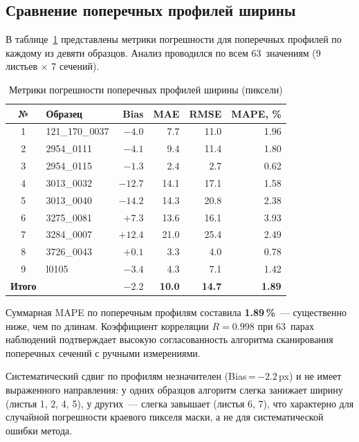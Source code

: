 \subsection{Сравнение поперечных профилей ширины}

В таблице~\ref{tab:cross} представлены метрики погрешности для поперечных профилей
по каждому из девяти образцов. Анализ проводился по всем 63~значениям (9 листьев $\times$ 7 сечений).

\begin{table}[H]
\centering
\caption{Метрики погрешности поперечных профилей ширины (пиксели)}
\label{tab:cross}
\begin{tabular}{clrrrr}
\hline
\textbf{№} & \textbf{Образец} & \textbf{Bias} & \textbf{MAE} & \textbf{RMSE} & \textbf{MAPE, \%} \\
\hline
1 & 121\_170\_0037 & $-4.0$ &  7.7 & 11.0 & 1.96 \\
2 & 2954\_0111     & $-4.1$ &  9.4 & 11.4 & 1.80 \\
3 & 2954\_0115     & $-1.3$ &  2.4 &  2.7 & 0.62 \\
4 & 3013\_0032     &$-12.7$ & 14.1 & 17.1 & 1.58 \\
5 & 3013\_0040     &$-14.2$ & 14.3 & 20.8 & 2.38 \\
6 & 3275\_0081     & $+7.3$ & 13.6 & 16.1 & 3.93 \\
7 & 3284\_0007     &$+12.4$ & 21.0 & 25.4 & 2.49 \\
8 & 3726\_0043     & $+0.1$ &  3.3 &  4.0 & 0.78 \\
9 & l0105          & $-3.4$ &  4.3 &  7.1 & 1.42 \\
\hline
\textbf{Итого} & & $\mathbf{-2.2}$ & \textbf{10.0} & \textbf{14.7} & \textbf{1.89} \\
\hline
\end{tabular}
\end{table}

Суммарная MAPE по поперечным профилям составила \textbf{1.89\,\%}~--- существенно ниже,
чем по длинам. Коэффициент корреляции $R = 0.998$ при 63~парах наблюдений подтверждает
высокую согласованность алгоритма сканирования поперечных сечений с ручными измерениями.

Систематический сдвиг по профилям незначителен (Bias\,=\,$-2.2$\,px) и не имеет
выраженного направления: у одних образцов алгоритм слегка занижает ширину (листья 1, 2, 4, 5),
у других~--- слегка завышает (листья 6, 7), что характерно для случайной погрешности краевого
пикселя маски, а не для систематической ошибки метода.

